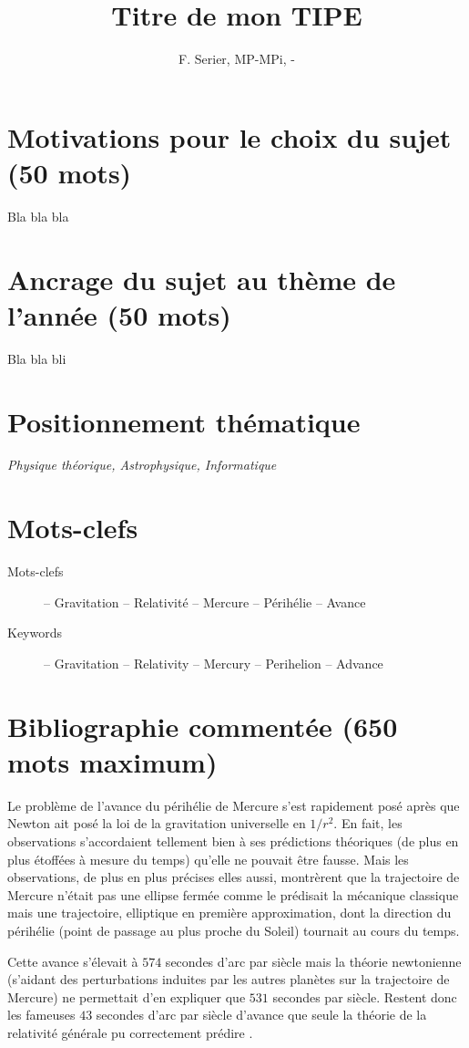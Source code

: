 \documentclass[12pt,a4paper]{article}
\title{Titre de mon TIPE}
\author{F. Serier, MP\oldstylenums{1}-MPi, \oldstylenums{\the\year}-\oldstylenums{\arabic{nextyear}} }
\newcommand{\ofg}[1]{\og{}#1\fg{}}
\newcommand{\positionnementThematique}[1]{
\section*{Positionnement thématique}
{\it #1}}
\newcommand{\motclefs}[2]{
    \section*{Mots-clefs}
        \begin{description}
            \item[Mots-clefs] -- #1 
            \item[Keywords]   -- #2
        \end{description}
}
\begin{document}
\maketitle
\section*{Motivations pour le choix du sujet (50 mots)}
Bla bla bla
\section*{Ancrage du sujet au thème de l'année (50 mots)}
Bla bla bli
\positionnementThematique{Physique théorique, Astrophysique, Informatique}
\motclefs{Gravitation -- Relativité -- Mercure -- Périhélie -- Avance}{Gravitation -- Relativity -- Mercury -- Perihelion -- Advance}
\section*{Bibliographie commentée (650 mots maximum)}

Le problème de l'avance du périhélie de Mercure s'est rapidement 
          posé après que Newton ait posé la loi de la gravitation universelle en $1/r^2$. En fait, les observations s'accordaient tellement bien à ses prédictions théoriques (de plus en plus étoffées à mesure du temps) qu'elle ne pouvait être fausse. Mais les observations, de plus en plus précises elles aussi, montrèrent que la trajectoire de Mercure n'était pas une ellipse fermée comme le prédisait la mécanique classique mais une trajectoire, elliptique en première approximation, dont la direction du périhélie (point de passage au plus proche du Soleil) tournait au cours du temps.


Cette avance s'élevait à $574$ secondes d'arc par siècle mais la théorie newtonienne (s'aidant des perturbations induites par les autres planètes sur la trajectoire de Mercure) ne permettait d'en expliquer \ofg{que}  $531$ secondes par siècle. Restent donc les \ofg{fameuses} $43$ secondes d'arc par siècle d'avance que seule la théorie de la relativité générale pu correctement prédire \cite{einstein1916grundlage}.
\end{document}
